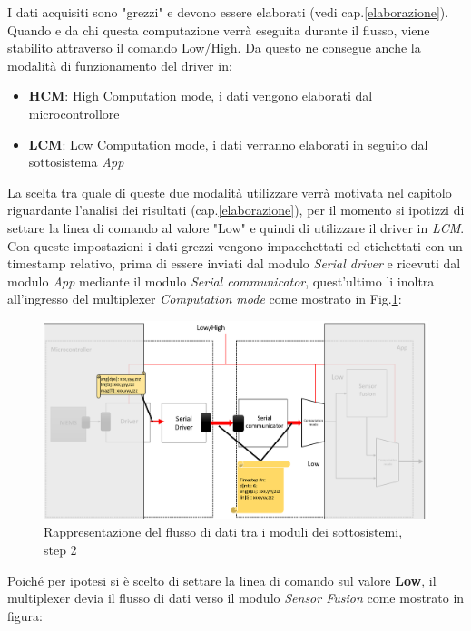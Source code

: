 I dati acquisiti sono "grezzi" e devono essere elaborati (vedi cap.\ref{elaborazione}). Quando e da chi questa computazione verrà eseguita durante il flusso, viene stabilito attraverso il comando Low/High. Da questo ne consegue anche la modalità di funzionamento del driver in:
\begin{itemize}
	\item \textbf{HCM}: High Computation mode, i dati vengono elaborati dal microcontrollore
	\item \textbf{LCM}: Low Computation mode, i dati verranno elaborati in seguito dal sottosistema \textit{App} 
\end{itemize}
La scelta tra quale di queste due modalità utilizzare verrà motivata nel capitolo riguardante l'analisi dei risultati (cap.\ref{elaborazione}), per il momento si ipotizzi di settare la linea di comando al valore "Low" e quindi di utilizzare il driver in \textit{LCM}. Con queste impostazioni i dati grezzi vengono impacchettati ed etichettati con un timestamp relativo, prima di essere inviati dal modulo \textit{Serial driver} e ricevuti dal modulo \textit{App} mediante il modulo \textit{Serial communicator}, quest'ultimo li inoltra all'ingresso del multiplexer \textit{Computation mode} come mostrato in Fig.\ref{fig:flusso2}:
\begin{figure}[H]  
	\centering 
	\includegraphics[scale=0.25 ]{DescrizioneDelSistema/flusso2.png}
	\caption{Rappresentazione del flusso di dati tra i moduli dei sottosistemi, step 2}
	\label{fig:flusso2}
\end{figure}
Poiché per ipotesi si è scelto di settare la linea di comando sul valore \textbf{Low}, il multiplexer devia il flusso di dati verso il modulo \textit{Sensor Fusion} come mostrato in figura:
